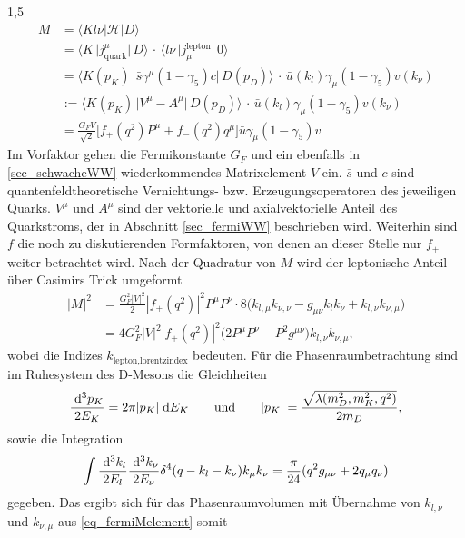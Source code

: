 \documentclass[11pt,a4paper,twoside]{report}
\begin{document}
\begin{spacing}{1,5}
\begin{align}
 M &= \big\langle Kl\nu|\mathcal{H}|D\big\rangle\nonumber\\
 &= \big\langle K\, \big|j_\text{quark}^\mu\big|\,D \big\rangle \,\cdot\,\big\langle l\nu\,\big|j_\mu^\text{lepton}\big|\,0\big\rangle\nonumber\\
 &= \big\langle K(p_K)\, \big|\bar s \gamma^\mu(1-\gamma_5) c \big|\,D(p_D) \big\rangle \, \cdot \,\bar u(k_l) \gamma_\mu(1-\gamma_5)v(k_\nu)\nonumber\\
 &:= \big\langle K(p_K)\, \big|V^\mu - A^\mu\big|\,D(p_D) \big\rangle \, \cdot \,\bar u(k_l) \gamma_\mu(1-\gamma_5)v(k_\nu)\nonumber\\
 &=\frac{G_F V}{\sqrt{2}} \big[f_+(q^2) P^\mu  + f_-(q^2) q^\mu\big] \bar u \gamma_\mu(1-\gamma_5)v
 \label{eq_fermiMG_F}
 \end{align}
Im Vorfaktor gehen die Fermikonstante $G_F$ und ein ebenfalls in \ref{sec_schwacheWW} wiederkommendes Matrixelement $V$ ein. $\bar s$ und $c$ sind quantenfeldtheoretische 
Vernichtungs- bzw. Erzeugungsoperatoren des jeweiligen Quarks. $V^\mu$ und $A^\mu$ sind der vektorielle und axialvektorielle Anteil des Quarkstroms, der 
in Abschnitt \ref{sec_fermiWW} beschrieben wird. Weiterhin sind $f$ die noch zu
diskutierenden Formfaktoren, von denen an dieser Stelle nur $f_+$ weiter betrachtet wird. Nach der Quadratur von $M$ wird der leptonische Anteil über 
Casimirs Trick \cite{Griffiths} umgeformt
\begin{align}
 \big|M\big|^2 &= \frac{G_F^2|V|^2}{2}|f_+(q^2)|^2 P^\mu P^\nu \cdot 8\big(k_{l,\mu} k_{\nu,\nu} - g_{\mu\nu}k_lk_\nu + k_{l,\nu}k_{\nu,\mu}\big)\nonumber\\
 &=4G_F^2|V|^2 |f_+(q^2)|^2 \big(2P^\mu P^\nu - P^2 g^{\mu\nu}\big) k_{l,\nu}k_{\nu,\mu},
 \label{eq_fermiMelement}
\end{align}
wobei die Indizes $k_{\text{lepton},\text{lorentzindex}}$ bedeuten. Für die Phasenraumbetrachtung sind im Ruhesystem des D-Mesons die Gleichheiten
\begin{align}
 \frac{\; \mathrm{d}^3 p_K}{2E_K} = 2\pi |p_K| \; \mathrm{d} E_K \qquad \text{und} \qquad |p_K| = \frac{\sqrt{\lambda(m_D^2,m_K^2,q^2)}}{2m_D},
\end{align}
sowie die Integration
\begin{align}
 \int \frac{\; \mathrm{d}^3k_l}{2E_l}\frac{\; \mathrm{d}^3k_\nu}{2E_\nu}\delta^4(q-k_l-k_\nu)k_\mu k_\nu = \frac{\pi}{24}(q^2 g_{\mu\nu} + 2 q_\mu q_\nu)
\end{align}
gegeben. Das ergibt sich für das Phasenraumvolumen mit Übernahme von $k_{l,\nu}$ und $k_{\nu,\mu}$ aus \eqref{eq_fermiMelement} somit

\end{spacing}
\end{document}
